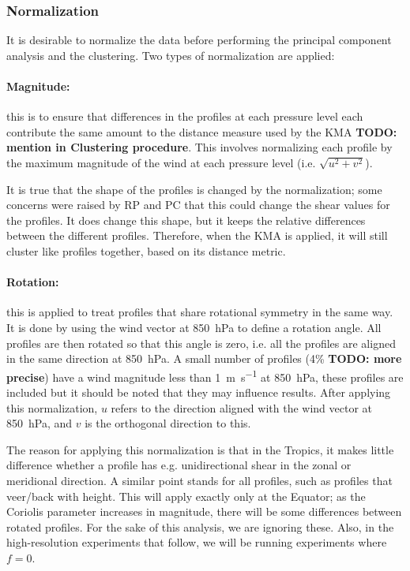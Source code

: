 \documentclass{article}
\newcommand\todo[1]{\textbf{TODO: #1}}
\begin{document}
\subsubsection{Normalization}
\label{sec:normalization}

It is desirable to normalize the data before performing the principal component analysis and the clustering. Two types of normalization are applied:

\paragraph{Magnitude:}

this is to ensure that differences in the profiles at each pressure level each contribute the same amount to the distance measure used by the KMA \todo{mention in Clustering procedure}. This involves normalizing each profile by the maximum magnitude of the wind at each pressure level (i.e. $\sqrt{u^2 + v^2}$).

It is true that the shape of the profiles is changed by the normalization; some concerns were raised by RP and PC that this could change the shear values for the profiles. It does change this shape, but it keeps the relative differences between the different profiles. Therefore, when the KMA is applied, it will still cluster like profiles together, based on its distance metric.

\paragraph{Rotation:}

this is applied to treat profiles that share rotational symmetry in the same way. It is done by using the wind vector at \SI{850}{hPa} to define a rotation angle. All profiles are then rotated so that this angle is zero, i.e. all the profiles are aligned in the same direction at \SI{850}{hPa}. A small number of profiles (4\% \todo{more precise}) have a wind magnitude less than \SI{1}{m.s^{-1}} at \SI{850}{hPa}, these profiles are included but it should be noted that they may influence results. After applying this normalization, $u$ refers to the direction aligned with the wind vector at \SI{850}{hPa}, and $v$ is the orthogonal direction to this.

The reason for applying this normalization is that in the Tropics, it makes little difference whether a profile has e.g. unidirectional shear in the zonal or meridional direction. A similar point stands for all profiles, such as profiles that veer/back with height. This will apply exactly only at the Equator; as the Coriolis parameter increases in magnitude, there will be some differences between rotated profiles. For the sake of this analysis, we are ignoring these. Also, in the high-resolution experiments that follow, we will be running experiments where $f = 0$.
\end{document}
